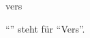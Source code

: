 \documentclass{stex}
\begin{document}
\begin{smodule}{vers}
\begin{sparagraph}[style=symdoc]
``'' steht für ``Vers''.
\end{sparagraph}
\end{smodule}
\end{document}
